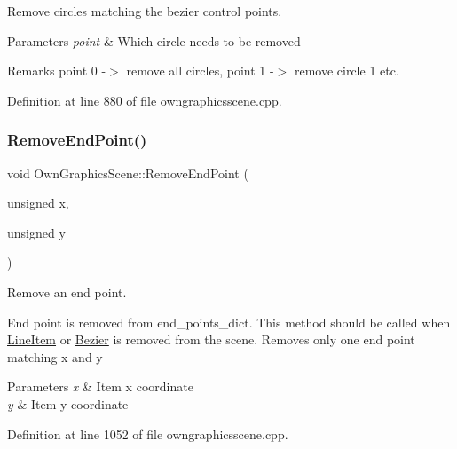 Remove circles matching the bezier control points. 


\begin{DoxyParams}{Parameters}
{\em point} & Which circle needs to be removed \\
\hline
\end{DoxyParams}
\begin{DoxyRemark}{Remarks}
point 0 -\/$>$ remove all circles, point 1 -\/$>$ remove circle 1 etc. 
\end{DoxyRemark}


Definition at line 880 of file owngraphicsscene.\+cpp.

\mbox{\label{classOwnGraphicsScene_a4f029a37e96fc022295ce4e421319ddf}} 
\subsubsection{\texorpdfstring{Remove\+End\+Point()}{RemoveEndPoint()}}
{\footnotesize\ttfamily void Own\+Graphics\+Scene\+::\+Remove\+End\+Point (\begin{DoxyParamCaption}\item[{unsigned}]{x,  }\item[{unsigned}]{y }\end{DoxyParamCaption})}



Remove an end point. 

End point is removed from end\+\_\+points\+\_\+dict. This method should be called when \mbox{\hyperlink{classLineItem}{Line\+Item}} or \mbox{\hyperlink{classBezier}{Bezier}} is removed from the scene. Removes only one end point matching x and y 
\begin{DoxyParams}{Parameters}
{\em x} & Item x coordinate \\
\hline
{\em y} & Item y coordinate \\
\hline
\end{DoxyParams}


Definition at line 1052 of file owngraphicsscene.\+cpp.

\mbox{\label{classOwnGraphicsScene_a4b1ba1b97b89baad08c3ba5471ebb61f}} 
